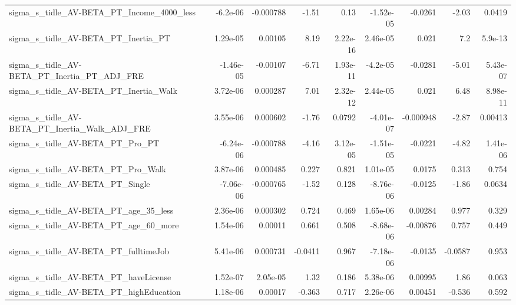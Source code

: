 \begin{tabular}{lrrrrrrrr}
sigma\_s\_tidle\_AV-BETA\_PT\_Income\_4000\_less          &    -6.2e-06 &    -0.000788 &    -1.51 &     0.13 &  -1.52e-05 &     -0.0261 &        -2.03 &        0.0419 \\
sigma\_s\_tidle\_AV-BETA\_PT\_Inertia\_PT                &    1.29e-05 &      0.00105 &     8.19 & 2.22e-16 &   2.46e-05 &       0.021 &          7.2 &       5.9e-13 \\
sigma\_s\_tidle\_AV-BETA\_PT\_Inertia\_PT\_ADJ\_FRE        &   -1.46e-05 &     -0.00107 &    -6.71 & 1.93e-11 &   -4.2e-05 &     -0.0281 &        -5.01 &      5.43e-07 \\
sigma\_s\_tidle\_AV-BETA\_PT\_Inertia\_Walk              &    3.72e-06 &     0.000287 &     7.01 & 2.32e-12 &   2.44e-05 &       0.021 &         6.48 &      8.98e-11 \\
sigma\_s\_tidle\_AV-BETA\_PT\_Inertia\_Walk\_ADJ\_FRE      &    3.55e-06 &     0.000602 &    -1.76 &   0.0792 &  -4.01e-07 &   -0.000948 &        -2.87 &       0.00413 \\
sigma\_s\_tidle\_AV-BETA\_PT\_Pro\_PT                    &   -6.24e-06 &    -0.000788 &    -4.16 & 3.12e-05 &  -1.51e-05 &     -0.0221 &        -4.82 &      1.41e-06 \\
sigma\_s\_tidle\_AV-BETA\_PT\_Pro\_Walk                  &    3.87e-06 &     0.000485 &    0.227 &    0.821 &   1.01e-05 &      0.0175 &        0.313 &         0.754 \\
sigma\_s\_tidle\_AV-BETA\_PT\_Single                    &   -7.06e-06 &    -0.000765 &    -1.52 &    0.128 &  -8.76e-06 &     -0.0125 &        -1.86 &        0.0634 \\
sigma\_s\_tidle\_AV-BETA\_PT\_age\_35\_less               &    2.36e-06 &     0.000302 &    0.724 &    0.469 &   1.65e-06 &     0.00284 &        0.977 &         0.329 \\
sigma\_s\_tidle\_AV-BETA\_PT\_age\_60\_more               &    1.54e-06 &      0.00011 &    0.661 &    0.508 &  -8.68e-06 &    -0.00876 &        0.757 &         0.449 \\
sigma\_s\_tidle\_AV-BETA\_PT\_fulltimeJob               &    5.41e-06 &     0.000731 &  -0.0411 &    0.967 &  -7.18e-06 &     -0.0135 &      -0.0587 &         0.953 \\
sigma\_s\_tidle\_AV-BETA\_PT\_haveLicense               &    1.52e-07 &     2.05e-05 &     1.32 &    0.186 &   5.38e-06 &     0.00995 &         1.86 &         0.063 \\
sigma\_s\_tidle\_AV-BETA\_PT\_highEducation             &    1.18e-06 &      0.00017 &   -0.363 &    0.717 &   2.26e-06 &     0.00451 &       -0.536 &         0.592 \\

\end{tabular}
